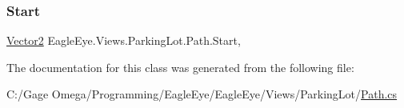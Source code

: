 \mbox{\label{class_eagle_eye_1_1_views_1_1_parking_lot_1_1_path_ab021d49dd55f3c76c2162882d296f873}} 
\subsubsection{\texorpdfstring{Start}{Start}}
{\footnotesize\ttfamily \mbox{\hyperlink{class_eagle_eye_1_1_views_1_1_parking_lot_1_1_vector2}{Vector2}} Eagle\+Eye.\+Views.\+Parking\+Lot.\+Path.\+Start\hspace{0.3cm}{\ttfamily [get]}, {\ttfamily [set]}}



The documentation for this class was generated from the following file\+:\begin{DoxyCompactItemize}
\item 
C\+:/\+Gage Omega/\+Programming/\+Eagle\+Eye/\+Eagle\+Eye/\+Views/\+Parking\+Lot/\mbox{\hyperlink{_path_8cs}{Path.\+cs}}\end{DoxyCompactItemize}
